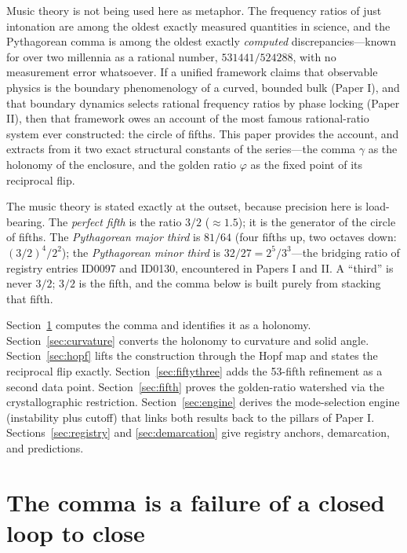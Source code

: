 \documentclass[11pt]{article}
\theoremstyle{remark}
\begin{document}
Music theory is not being used here as metaphor. The frequency ratios of just intonation are among the oldest exactly measured quantities in science, and the Pythagorean comma is among the oldest exactly \emph{computed} discrepancies---known for over two millennia as a rational number, $531441/524288$, with no measurement error whatsoever. If a unified framework claims that observable physics is the boundary phenomenology of a curved, bounded bulk (Paper I), and that boundary dynamics selects rational frequency ratios by phase locking (Paper II), then that framework owes an account of the most famous rational-ratio system ever constructed: the circle of fifths. This paper provides the account, and extracts from it two exact structural constants of the series---the comma $\gamma$ as the holonomy of the enclosure, and the golden ratio $\varphi$ as the fixed point of its reciprocal flip.

The music theory is stated exactly at the outset, because precision here is load-bearing. The \emph{perfect fifth} is the ratio $3/2$ ($\approx 1.5$); it is the generator of the circle of fifths. The \emph{Pythagorean major third} is $81/64$ (four fifths up, two octaves down: $(3/2)^4/2^2$); the \emph{Pythagorean minor third} is $32/27 = 2^5/3^3$---the bridging ratio of registry entries ID0097 and ID0130, encountered in Papers I and II. A ``third'' is never $3/2$; $3/2$ is the fifth, and the comma below is built purely from stacking that fifth.

Section~\ref{sec:comma} computes the comma and identifies it as a holonomy. Section~\ref{sec:curvature} converts the holonomy to curvature and solid angle. Section~\ref{sec:hopf} lifts the construction through the Hopf map and states the reciprocal flip exactly. Section~\ref{sec:fiftythree} adds the 53-fifth refinement as a second data point. Section~\ref{sec:fifth} proves the golden-ratio watershed via the crystallographic restriction. Section~\ref{sec:engine} derives the mode-selection engine (instability plus cutoff) that links both results back to the pillars of Paper I. Sections~\ref{sec:registry} and \ref{sec:demarcation} give registry anchors, demarcation, and predictions.

\section{The comma is a failure of a closed loop to close}
\label{sec:comma}
\end{document}
